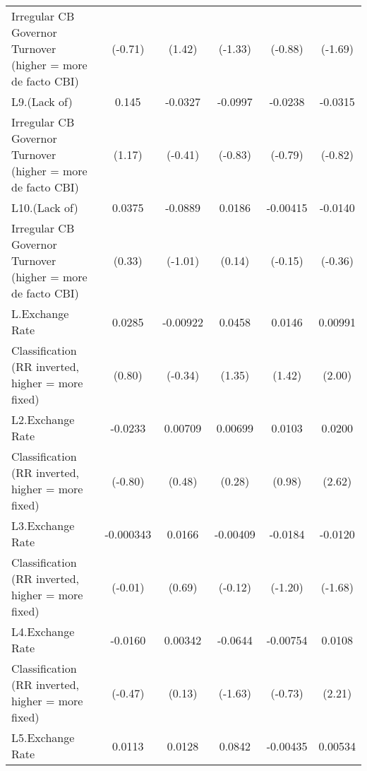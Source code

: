 {\begin{tabular}{l*{5}{c}}
Irregular CB Governor Turnover (higher = more de facto CBI)&     (-0.71)         &      (1.42)         &     (-1.33)         &     (-0.88)         &     (-1.69)         \\
[1em]
L9.(Lack of)        &       0.145         &     -0.0327         &     -0.0997         &     -0.0238         &     -0.0315         \\
Irregular CB Governor Turnover (higher = more de facto CBI)&      (1.17)         &     (-0.41)         &     (-0.83)         &     (-0.79)         &     (-0.82)         \\
[1em]
L10.(Lack of)       &      0.0375         &     -0.0889         &      0.0186         &    -0.00415         &     -0.0140         \\
Irregular CB Governor Turnover (higher = more de facto CBI)&      (0.33)         &     (-1.01)         &      (0.14)         &     (-0.15)         &     (-0.36)         \\
[1em]
L.Exchange Rate     &      0.0285         &    -0.00922         &      0.0458         &      0.0146         &     0.00991\sym{*}  \\
Classification (RR inverted, higher = more fixed)&      (0.80)         &     (-0.34)         &      (1.35)         &      (1.42)         &      (2.00)         \\
[1em]
L2.Exchange Rate    &     -0.0233         &     0.00709         &     0.00699         &      0.0103         &      0.0200\sym{**} \\
Classification (RR inverted, higher = more fixed)&     (-0.80)         &      (0.48)         &      (0.28)         &      (0.98)         &      (2.62)         \\
[1em]
L3.Exchange Rate    &   -0.000343         &      0.0166         &    -0.00409         &     -0.0184         &     -0.0120         \\
Classification (RR inverted, higher = more fixed)&     (-0.01)         &      (0.69)         &     (-0.12)         &     (-1.20)         &     (-1.68)         \\
[1em]
L4.Exchange Rate    &     -0.0160         &     0.00342         &     -0.0644         &    -0.00754         &      0.0108\sym{*}  \\
Classification (RR inverted, higher = more fixed)&     (-0.47)         &      (0.13)         &     (-1.63)         &     (-0.73)         &      (2.21)         \\
[1em]
L5.Exchange Rate    &      0.0113         &      0.0128         &      0.0842\sym{*}  &    -0.00435         &     0.00534         \\

\end{tabular}}
